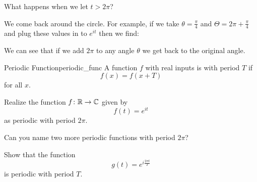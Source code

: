         \begin{question}
            What happens when we let $t>2\pi$?
        \end{question}

        \begin{answer}
            We come back around the circle. For example, if we take $\theta=\frac{\pi}{4}$ and $\Theta=2\pi + \frac{\pi}{4}$ and plug these values in to $e^{it}$ then we find:
            \begin{center}
        \end{center}
        We can see that if we add $2\pi$ to any angle $\theta$ we get back to the original angle.
        \end{answer}

        \begin{df}{Periodic Function}{periodic_func}
            A function $f$ with real inputs is  with period $T$ if
            \[
            f(x)=f(x+T)
            \]
            for all $x$.
        \end{df}

        \begin{exercise}
        Realize the function $f\colon \mathbb{R} \to \mathbb{C}$ given by
        \[
        f(t)=e^{it}
        \]
        as periodic with period $2\pi$.
        \end{exercise}

        \begin{exercise}
        Can you name two more periodic functions with period $2\pi$?
        \end{exercise}

        \begin{exercise}
        Show that the function
        \[
        g(t)=e^{i\frac{2\pi t}{T}}
        \]
        is periodic with period $T$.
        \end{exercise}

